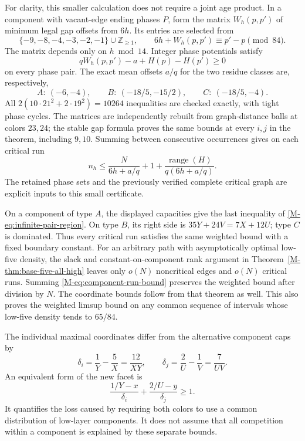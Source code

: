\documentclass[11pt,reqno]{amsart}
\theoremstyle{plain}
\theoremstyle{plain}
\theoremstyle{plain}
\begin{document}
For clarity, this smaller calculation does not require a joint age
product. In a component with vacant-edge ending phases $P$, form the
matrix $W_h(p,p')$ of minimum legal gap offsets from $6h$. Its entries
are selected from
\[
 \{-9,-8,-4,-3,-2,-1\}\cup\mathbb Z_{\ge1},
 \qquad 6h+W_h(p,p')\equiv p'-p\pmod{84}.
\]
The matrix depends only on $h\bmod14$. Integer phase potentials satisfy
\[
 qW_h(p,p')-a+H(p)-H(p')\ge0
\]
on every phase pair. The exact mean offsets $a/q$ for the two residue
classes are, respectively,
\[
 A:\ (-6,-4),\qquad
 B:\ (-18/5,-15/2),\qquad
 C:\ (-18/5,-4).
\]
All $2(10\cdot21^2+2\cdot19^2)=10264$ inequalities are checked
exactly, with tight phase cycles. The matrices are independently rebuilt
from graph-distance balls at colors $23,24$; the stable gap formula
proves the same bounds at every $i,j$ in the theorem, including $9,10$.
Summing between consecutive occurrences gives on each critical run
\begin{equation}\label{M-eq:component-run-bound}
 n_h\le\frac{N}{6h+a/q}+1+
          \frac{\operatorname{range}(H)}{q(6h+a/q)}.
\end{equation}
The retained phase sets and the previously verified complete critical
graph are explicit inputs to this small certificate.

On a component of type $A$, the displayed capacities give the last
inequality of \eqref{M-eq:infinite-pair-region}. On type $B$, its right
side is $35Y+24V=7X+12U$; type $C$ is dominated. Thus every critical
run satisfies the same weighted bound with a fixed boundary constant.
For an arbitrary path with asymptotically optimal low-five density,
the slack and constant-on-component rank argument in
Theorem~\ref{M-thm:base-five-all-high} leaves only $o(N)$ noncritical
edges and $o(N)$ critical runs. Summing
\eqref{M-eq:component-run-bound} preserves the weighted bound after
division by $N$. The coordinate bounds follow from that theorem as well.
This also proves the weighted limsup bound on any common sequence of
intervals whose low-five density tends to $65/84$.

The individual maximal coordinates differ from the alternative
component caps by
\[
 \delta_i=\frac1Y-\frac5X=\frac{12}{XY},\qquad
 \delta_j=\frac2U-\frac1V=\frac7{UV}.
\]
An equivalent form of the new facet is
\begin{equation}\label{M-eq:normalized-component-loss}
 \frac{1/Y-x}{\delta_i}+\frac{2/U-y}{\delta_j}\ge1.
\end{equation}
It quantifies the loss caused by requiring both colors to use a common
distribution of low-layer components. It does not assume that all
competition within a component is explained by these separate bounds.
\end{document}
